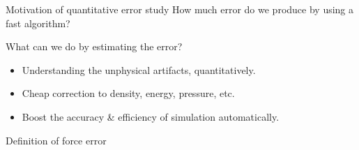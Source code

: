 \documentclass{beamer}
\newcommand{\redc}[1]{{\color{red} #1}}
\newcommand{\bluec}[1]{{\color{blue} #1}}
\newcommand{\vect}[1]{\textbf{\textit{#1}}}
\begin{document}
\begin{frame}{Motivation of quantitative error study}
  \redc{How much error do we produce by using a fast algorithm?}
  \\
  \vskip 1cm
  
  What can we do by estimating the error?
  \begin{itemize}\itemsep 3pt
  \item <2->Understanding
    the unphysical artifacts, quantitatively.
  \item <3->Cheap correction to density, energy, pressure, etc.
  \item <4->Boost the accuracy \& efficiency of simulation automatically.
  \end{itemize}  
  \vfill
\end{frame}



\begin{frame}{Definition of force error}
\end{frame}



\end{document}
